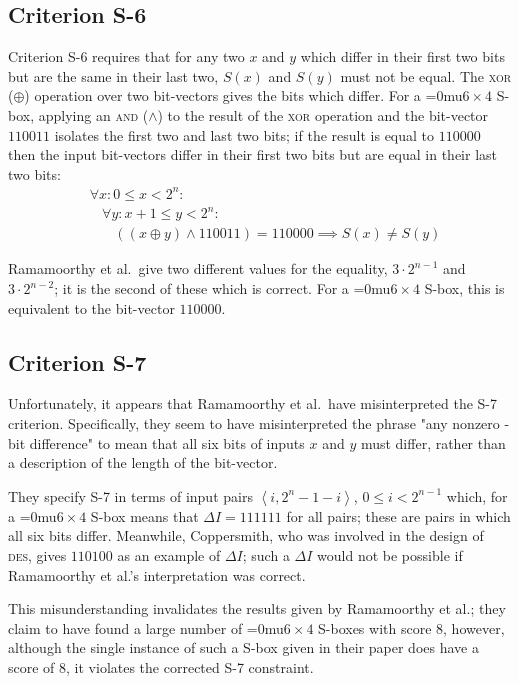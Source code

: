 \documentclass[a4paper,10pt,twoside,openright]{book}
\renewcommand{\sc}[1]{\textsc{\lowercase{#1}}}
\renewcommand{\ln}[1]{{\fontsize{8pt}{8pt}\selectfont#1}}
\newcommand{\tuple}[1]{\left\langle #1\right\rangle}
\newcommand*\sixbyfour{\begingroup\medmuskip=0mu\relax$6 \times 4$\endgroup}
\begin{document}
\subsection{Criterion S-6}
\label{sec:ssix}
Criterion S-6 requires that for any two $x$ and $y$ which differ in their first two bits but are the same in their last two, $S(x)$ and $S(y)$ must not be equal. 
The \sc{xor} ($\oplus$) operation over two bit-vectors gives the bits which differ. 
For a \sixbyfour{} S-box, applying an \sc{and} ($\land$) to 
the result of the \sc{xor} operation 
and the bit-vector $110011$ 
isolates the first two and last two bits; if the result is equal to $110000$ then the input bit-vectors differ in their first two bits but are equal in their last two bits:
\begin{align*}
    & \forall x : 0 \leq x < 2^n : \\
    & ~~~~ \forall y : x+1 \leq y < 2^n : \\
    & ~~~~~~~~ \left(\left(x \oplus y\right) \land 110011\right) = 110000 
    \implies
    S(x) \neq S(y)
\end{align*}

Ramamoorthy et al.\ give two different values for the equality, $3 \cdot 2^{n-1}$ and $3 \cdot 2^{n-2}$; it is the second of these which is correct. For a \sixbyfour{} S-box, this is equivalent to the bit-vector $110000$.

\subsection{Criterion S-7}

Unfortunately, it appears that Ramamoorthy et al.\ have misinterpreted the S-7 criterion. Specifically, they seem to have misinterpreted the phrase "any nonzero \ln{6}-bit difference" to mean that all six bits of inputs $x$ and $y$ must differ,
rather than a description of the length of the bit-vector. 

They specify S-7 in terms of input pairs $\tuple{i, 2^n-1-i}$, $0 \leq i < 2^{n-1}$ which, for a \sixbyfour{} S-box means that $\Delta I = 111111$ for all pairs; these are pairs in which all six bits differ.
Meanwhile, Coppersmith, who was involved in the design of \sc{DES}, gives $110100$ as an example of $\Delta I$; such a $\Delta I$ would not be possible if Ramamoorthy et al.'s interpretation was correct.

This misunderstanding invalidates the results given by Ramamoorthy et al.; 
they claim to have found a large number of \sixbyfour{} S-boxes with score $8$, however,
although the single instance of such a S-box given in their paper does have a score of $8$,
it violates the corrected S-7 constraint.
\end{document}
